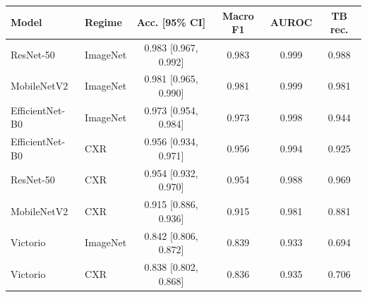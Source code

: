 \begin{tabular}{llcccc}
\hline
Model & Regime & Acc. [95\% CI] & Macro F1 & AUROC & TB rec. \\
\hline
ResNet-50 & ImageNet & 0.983 [0.967, 0.992] & 0.983 & 0.999 & 0.988 \\
MobileNetV2 & ImageNet & 0.981 [0.965, 0.990] & 0.981 & 0.999 & 0.981 \\
EfficientNet-B0 & ImageNet & 0.973 [0.954, 0.984] & 0.973 & 0.998 & 0.944 \\
EfficientNet-B0 & CXR & 0.956 [0.934, 0.971] & 0.956 & 0.994 & 0.925 \\
ResNet-50 & CXR & 0.954 [0.932, 0.970] & 0.954 & 0.988 & 0.969 \\
MobileNetV2 & CXR & 0.915 [0.886, 0.936] & 0.915 & 0.981 & 0.881 \\
Victorio & ImageNet & 0.842 [0.806, 0.872] & 0.839 & 0.933 & 0.694 \\
Victorio & CXR & 0.838 [0.802, 0.868] & 0.836 & 0.935 & 0.706 \\
\hline
\end{tabular}